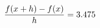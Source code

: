 \documentclass[preview]{standalone}
\begin{document}
\begin{align*}
\special{dvisvgm:raw <g id='unique000'>}\frac{f(x+h)-f(x)}{h} = 3.475\special{dvisvgm:raw </g>}
\end{align*}
\end{document}

